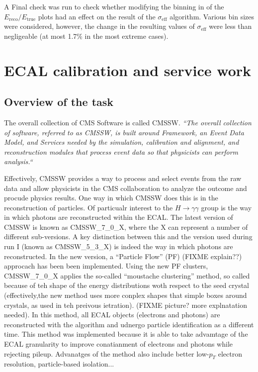 \documentclass[10pt]{article}
\begin{document}
A Final check was run to check whether modifying the binning in of the $E_{\text{reco}}/E_{\text{true}}$ plots had an effect on the result of the $\sigma_{\text{eff}}$ algorithm. Various bin sizes were considered, however, the change in the resulting values of $\sigma_{\text{eff}}$ were less than negligeable (at most 1.7\% in the most extreme cases).








\section{ECAL calibration and service work}
\subsection{Overview of the task}

The overall collection of CMS Software is called CMSSW. \textit{``The overall collection of software, referred to as CMSSW, is built around Framework, an Event Data Model, and Services needed by the simulation, calibration and alignment, and reconstruction modules that process event data so that physicists can perform analysis.``}~\cite{CMSSW}

Effectively, CMSSW provides a way to process and select events from the raw data and allow physicists in the CMS collaboration to analyze the outcome and procude physics results. One way in which CMSSW does this is in the reconstruction of particles. Of particualr interest to the $H \rightarrow \gamma \gamma$ group is the way in which photons are reconstructed within the ECAL. The latest version of CMSSW is known as CMSSW\_7\_0\_X, where the X can represent a number of different sub-versions. A key distinction between this and the version used during run I (known as CMSSW\_5\_3\_X) is indeed the way in which photons are reconstructed. In the new version, a ``Particle Flow'' (PF) (FIXME explain??) approcach has been been implemented. Using the new PF clusters, CMSSW\_7\_0\_X applies the so-called ``moustache clustering'' method, so called because of teh shape of the energy distributions woth respect to the seed crystal (effectively,the new method uses more conplex shapes that simple boxes around crystals, as used in teh preivous ietration). (FIXME picture? more explnatation needed). In this method, all ECAL objects (electrons and photons) are reconstructed with the algorithm and udnergo particle identification as a different time. This method was implemented because it is able to take advamtage of the ECAL granularity to improve conatianment of electrons and photons while rejecting pileup. Advanatges of the method also include better low-$p_T$ electron resolution, particle-based isolation... 
\end{document}
